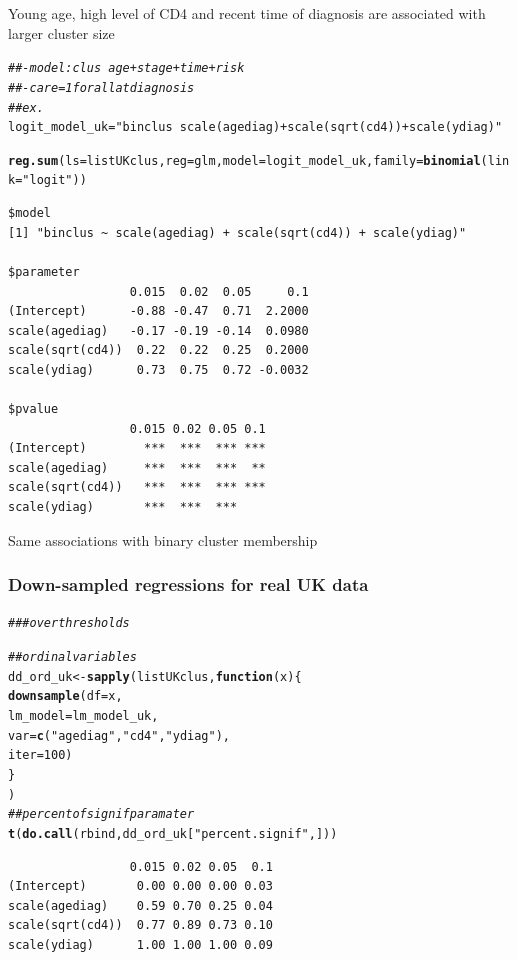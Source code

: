 \documentclass[]{revtex4}\usepackage[]{graphicx}\usepackage[]{color}
\makeatletter
\newcommand{\hlnum}[1]{\textcolor[rgb]{0.686,0.059,0.569}{#1}}%
\newcommand{\hlstr}[1]{\textcolor[rgb]{0.192,0.494,0.8}{#1}}%
\newcommand{\hlcom}[1]{\textcolor[rgb]{0.678,0.584,0.686}{\textit{#1}}}%
\newcommand{\hlstd}[1]{\textcolor[rgb]{0.345,0.345,0.345}{#1}}%
\newcommand{\hlkwa}[1]{\textcolor[rgb]{0.161,0.373,0.58}{\textbf{#1}}}%
\newcommand{\hlkwb}[1]{\textcolor[rgb]{0.69,0.353,0.396}{#1}}%
\newcommand{\hlkwc}[1]{\textcolor[rgb]{0.333,0.667,0.333}{#1}}%
\newcommand{\hlkwd}[1]{\textcolor[rgb]{0.737,0.353,0.396}{\textbf{#1}}}%
\newenvironment{kframe}{%
 \def\at@end@of@kframe{}%
 \ifinner\ifhmode%
  \def\at@end@of@kframe{\end{minipage}}%
  \begin{minipage}{\columnwidth}%
 \fi\fi%
 \def\FrameCommand##1{\hskip\@totalleftmargin \hskip-\fboxsep
 \colorbox{shadecolor}{##1}\hskip-\fboxsep
     \hskip-\linewidth \hskip-\@totalleftmargin \hskip\columnwidth}%
 \MakeFramed {\advance\hsize-\width
   \@totalleftmargin\z@ \linewidth\hsize
   \@setminipage}}%
 {\par\unskip\endMakeFramed%
 \at@end@of@kframe}
\newenvironment{knitrout}{}{} %
\makeatother
\begin{document}
Young age, high level of CD4 and recent time of diagnosis are associated with larger cluster size
\begin{knitrout}
\color{fgcolor}\begin{kframe}
\begin{alltt}
\hlcom{##- model: clus ~ age +  stage + time + risk}
\hlcom{##- care = 1 for all at diagnosis}
\hlcom{## ex. }
\hlstd{logit_model_uk} \hlkwb{=} \hlstr{"binclus ~ scale(agediag) + scale(sqrt(cd4)) + scale(ydiag)"}

\hlkwd{reg.sum}\hlstd{(}\hlkwc{ls} \hlstd{= listUKclus,} \hlkwc{reg} \hlstd{= glm,} \hlkwc{model} \hlstd{= logit_model_uk,} \hlkwc{family} \hlstd{=} \hlkwd{binomial}\hlstd{(}\hlkwc{link} \hlstd{=} \hlstr{"logit"}\hlstd{))}
\end{alltt}
\begin{verbatim}
$model
[1] "binclus ~ scale(agediag) + scale(sqrt(cd4)) + scale(ydiag)"

$parameter
                 0.015  0.02  0.05     0.1
(Intercept)      -0.88 -0.47  0.71  2.2000
scale(agediag)   -0.17 -0.19 -0.14  0.0980
scale(sqrt(cd4))  0.22  0.22  0.25  0.2000
scale(ydiag)      0.73  0.75  0.72 -0.0032

$pvalue
                 0.015 0.02 0.05 0.1
(Intercept)        ***  ***  *** ***
scale(agediag)     ***  ***  ***  **
scale(sqrt(cd4))   ***  ***  *** ***
scale(ydiag)       ***  ***  ***    
\end{verbatim}
\end{kframe}
\end{knitrout}
Same associations with binary cluster membership

\subsubsection{Down-sampled regressions for real UK data}
\begin{knitrout}
\color{fgcolor}\begin{kframe}
\begin{alltt}
\hlcom{### over thresholds}

\hlcom{## ordinal variables}
\hlstd{dd_ord_uk} \hlkwb{<-} \hlkwd{sapply}\hlstd{( listUKclus,} \hlkwa{function}\hlstd{(}\hlkwc{x}\hlstd{) \{}
  \hlkwd{downsample}\hlstd{(}\hlkwc{df} \hlstd{= x,}
             \hlkwc{lm_model} \hlstd{= lm_model_uk,}
             \hlkwc{var} \hlstd{=} \hlkwd{c}\hlstd{(}\hlstr{"agediag"}\hlstd{,} \hlstr{"cd4"}\hlstd{,} \hlstr{"ydiag"}\hlstd{),}
             \hlkwc{iter} \hlstd{=} \hlnum{100}\hlstd{)}
\hlstd{\}}
\hlstd{)}
\hlcom{## percent of signif paramater}
\hlkwd{t}\hlstd{(}\hlkwd{do.call}\hlstd{(rbind, dd_ord_uk[}\hlstr{"percent.signif"}\hlstd{, ] ))}
\end{alltt}
\begin{verbatim}
                 0.015 0.02 0.05  0.1
(Intercept)       0.00 0.00 0.00 0.03
scale(agediag)    0.59 0.70 0.25 0.04
scale(sqrt(cd4))  0.77 0.89 0.73 0.10
scale(ydiag)      1.00 1.00 1.00 0.09
\end{verbatim}
\end{kframe}
\end{knitrout}
\end{document}
